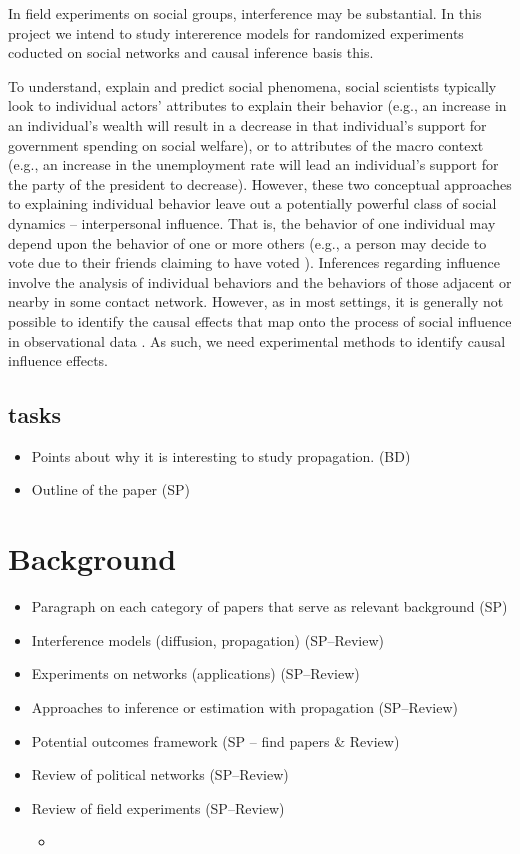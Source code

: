 \documentclass[12pt]{article}
\begin{document}
In field experiments on social groups, interference may be substantial. In this project we intend to study intererence models for randomized experiments coducted on social networks and causal inference basis this.

To understand, explain and predict social phenomena, social scientists typically look to individual actors' attributes to explain their behavior (e.g., an increase in an individual's wealth will result in a decrease in that individual's support for government spending on social welfare), or to attributes of the macro context (e.g., an increase in the unemployment rate will lead an individual's support for the party of the president to decrease). However, these two conceptual approaches to explaining individual behavior leave out a potentially powerful class of social dynamics -- interpersonal influence. That is, the behavior of one individual may depend upon the behavior of one or more others (e.g., a person may decide to vote due to their friends claiming to have voted \citep{Bond:2012}). Inferences regarding influence involve the analysis of individual behaviors and the behaviors of those adjacent or nearby in some contact network. However, as in most settings, it is generally not possible to identify the causal effects that map onto the process of social influence in observational data \citep{Shalizi:2011}. As such, we need experimental methods to identify causal influence effects.

\subsection{tasks}
\begin{itemize}
\item Points about why it is interesting to study propagation. (BD)
\item Outline of the paper (SP)
\end{itemize}

\section{Background}

\begin{itemize}
\item Paragraph on each category of papers that serve as relevant background (SP)
\item Interference models (diffusion, propagation) (SP--Review)
\item  Experiments on networks (applications) (SP--Review)
\item Approaches to inference or estimation with propagation (SP--Review) 
\item Potential outcomes framework (SP -- find papers \& Review)
\item Review of political networks (SP--Review)
\item Review of field experiments (SP--Review)
\begin{itemize}
\item \citep{Gottlieb:2015,Alatas:2012,Kalla:2015, Malesky:2012,Ichino:2012,Nyhan:2014}
\end{itemize}
\end{itemize}
\end{document}
